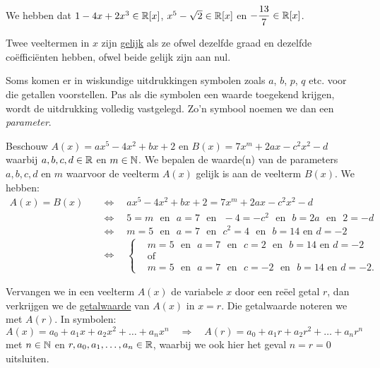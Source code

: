 \documentclass{ximera}
\begin{document}
\begin{example} We hebben dat $1-4x+2x^3 \in \mathbb{R}[x]$, $x^5-\sqrt{2} \in \mathbb{R}[x]$ en $\displaystyle -\frac{13}{7} \in \mathbb{R}[x]$.   
\end{example}

Twee veeltermen in $x$ zijn \underline{gelijk} als ze ofwel dezelfde graad en dezelfde co\"effici\"enten hebben, ofwel beide gelijk zijn aan nul. 

Soms komen er in wiskundige uitdrukkingen symbolen zoals $a$, $b$, $p$, $q$ etc. voor die getallen voorstellen. Pas als die symbolen een waarde toegekend krijgen, wordt de uitdrukking volledig vastgelegd. Zo'n symbool noemen we dan een {\em parameter}. 

\begin{example}
Beschouw $A(x) = ax^5 - 4x^2 + bx + 2$ en $B(x) = 7x^m + 2ax - c^2x^2 - d$ waarbij $a,b,c,d \in \mathbb{R}$ en $m \in \mathbb{N}$. We bepalen de waarde(n) van de parameters $a,b,c,d$ en $m$ waarvoor de veelterm $A(x)$ gelijk is aan de veelterm $B(x)$. We hebben: 
\begin{align*}
A(x) = B(x) \quad 
& \Leftrightarrow \quad ax^5 - 4x^2 + bx + 2 = 7x^m + 2ax - c^2x^2 - d \\
& \Leftrightarrow \quad 5 = m \,\,\text{ en }\,\, a = 7 \,\,\text{ en }\,\, -4 = -c^2 \,\,\text{ en }\,\, b = 2a \,\,\text{ en }\,\, 2 = -d \\
& \Leftrightarrow \quad m=5 \,\,\text{ en }\,\, a = 7 \,\,\text{ en }\,\, c^2 = 4 \,\,\text{ en }\,\, b = 14 \text{ en } d = -2 \\
& \Leftrightarrow \quad 
\left\{
\begin{aligned}
& m=5 \,\,\text{ en }\,\, a = 7 \,\,\text{ en }\,\, c = 2 \,\,\text{ en }\,\, b = 14 \text{ en } d = -2 \\
& \text{of} \\
& m=5 \,\,\text{ en }\,\, a = 7 \,\,\text{ en }\,\, c = -2 \,\,\text{ en }\,\, b = 14 \text{ en } d = -2.
\end{aligned}
\right.
\end{align*}
\end{example}

Vervangen we in een veelterm $A(x)$ de variabele $x$ door een re\"eel getal $r$, dan verkrijgen we de \underline{getalwaarde} van $A(x)$ in $x = r$. Die getalwaarde noteren we met $A(r)$. In symbolen:
\[
A(x) = a_0 + a_1x + a_2x^2 + \dots + a_n x^n \quad 
\Rightarrow
\quad A(r) = a_0 + a_1 r + a_2r^2 + \dots + a_n r^n
\]
met $n \in \mathbb{N}$ en $r, a_0, a_1, \ldots, a_n \in \mathbb{R}$, waarbij we ook hier het geval $n = r = 0$ uitsluiten. %
\end{document}
